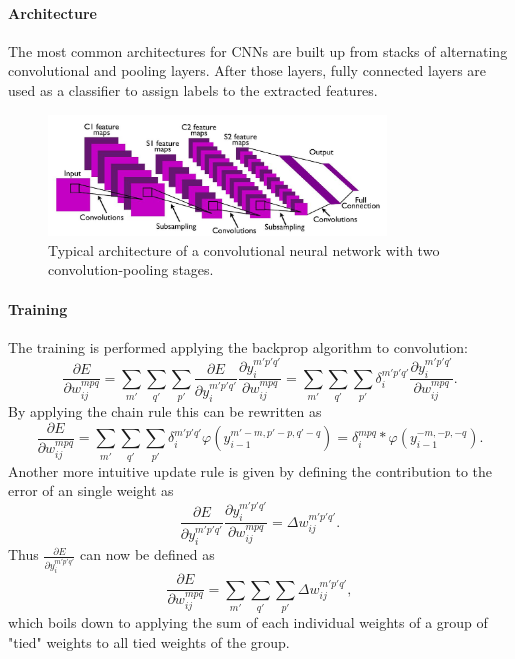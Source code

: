 \paragraph{Architecture}

The most common architectures for CNNs are built up from stacks of alternating convolutional and pooling layers. 
After those layers, fully connected layers are used as a classifier to assign
labels to the extracted features.

\begin{figure}[h]
	\centering
    	\includegraphics[width=0.8\textwidth]{imgs/cnn_architecture.jpg} 
    \caption{Typical architecture of a convolutional neural network with two convolution-pooling stages.}
	\label{fig:convarcitecuture}
\end{figure}

\paragraph{Training}


The training is performed applying the backprop algorithm to convolution:
\[
\frac{\partial E}{\partial w_{ij}^{mpq}} = \sum_{m'} \sum_ {q'}  \sum_{p'} \frac{\partial E}{\partial y_i^{m' p' q'}}  \frac{\partial y_i^{m' p' q'}}{\partial w_{ij}^{mpq}}  = \sum_{m'} \sum_ {q'}  \sum_{p'} \delta_i^{m' p' q'}  \frac{\partial y_i^{m' p' q'}}{\partial w_{ij}^{mpq}}.
\] 
By applying the chain rule this can be rewritten as
\[
\frac{\partial E}{\partial w_{ij}^{mpq}} = \sum_{m'} \sum_ {q'}  \sum_{p'} \delta_i^{m' p' q'}  \varphi(y_{i-1}^{m'-m, p'-p, q'-q}) = \delta_i^{m p q}  * \varphi(y_{i-1}^{-m, -p, -q}).
\] 
Another more intuitive update rule is given by defining the contribution to the error of an single weight as
\[
\frac{\partial E}{\partial y_i^{m' p' q'}}  \frac{\partial y_i^{m' p' q'}}{\partial w_{ij}^{mpq}}  = \Delta w_{ij}^{m' p' q'}.
\] 
Thus $\frac{\partial E}{\partial y_i^{m' p' q'}}$ can now be defined as
\[
\frac{\partial E}{\partial w_{ij}^{mpq}} = \sum_{m'} \sum_ {q'}  \sum_{p'} \Delta w_{ij}^{m' p' q'},
\] 
which boils down to applying the sum of each individual weights of a group of "tied" weights to all tied weights of the group.



